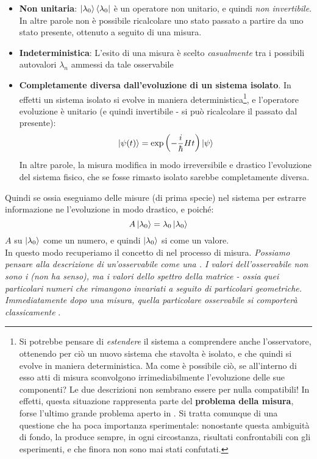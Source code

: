 \documentclass[../../FisicaTeorica.tex]{subfiles}
\begin{document}
\begin{itemize}
    \item \textbf{Non unitaria}: $\Ket{\lambda_0}\Bra{\lambda_0}$ è un operatore non unitario, e quindi \textit{non invertibile}. In altre parole non è possibile ricalcolare uno stato passato a partire da uno stato presente, ottenuto a seguito di una misura.
    \item \textbf{Indeterministica}: L'esito di una misura è scelto \textit{casualmente} tra i possibili autovalori $\lambda_n$ ammessi da tale osservabile
    \item \textbf{Completamente diversa dall'evoluzione di un sistema isolato}. In effetti un sistema isolato si evolve in maniera deterministica\footnote{Si potrebbe pensare di \textit{estendere} il sistema a comprendere anche l'osservatore, ottenendo per ciò un nuovo sistema che stavolta è isolato, e che quindi si evolve in maniera deterministica. Ma come è possibile ciò, se all'interno di esso atti di misura sconvolgono irrimediabilmente l'evoluzione delle sue componenti? Le due descrizioni non sembrano essere per nulla compatibili! In effetti, questa situazione rappresenta parte del \textbf{problema della misura}, forse l'ultimo grande problema aperto in \MQ. Si tratta comunque di una questione che ha poca importanza sperimentale: nonostante questa ambiguità di fondo, la \MQ produce sempre, in ogni circostanza, risultati confrontabili con gli esperimenti, e che finora non sono mai stati confutati.}, e l'operatore evoluzione è unitario (e quindi invertibile - si può ricalcolare il passato dal presente):
    \[
    \Ket{\psi(t)}=\exp\left(-\frac{i}{\hbar}Ht\right)\Ket{\psi}
    \]
    In altre parole, la misura modifica in modo irreversibile e drastico l'evoluzione del sistema fisico, che se fosse rimasto isolato sarebbe completamente diversa.
\end{itemize}
Quindi se  ossia eseguiamo delle misure (di prima specie) nel sistema per estrarre informazione ne  l'evoluzione in modo drastico, e poiché:
\[
A\Ket{\lambda_0}=\lambda_0\Ket{\lambda_0}
\]
$A$ su $\Ket{\lambda_0}$  come un numero, e quindi $\Ket{\lambda_0}$ si  come un valore.\\
In questo modo recuperiamo il concetto di  nel processo di misura.%
\textit{Possiamo pensare alla descrizione di un'osservabile come una . I valori dell'osservabile non sono i  (non ha senso), ma i valori dello spettro della matrice - ossia quei particolari numeri che rimangono invariati a seguito di particolari  geometriche. Immediatamente dopo una misura, quella particolare osservabile si comporterà \textit{classicamente} }.\\
\end{document}
